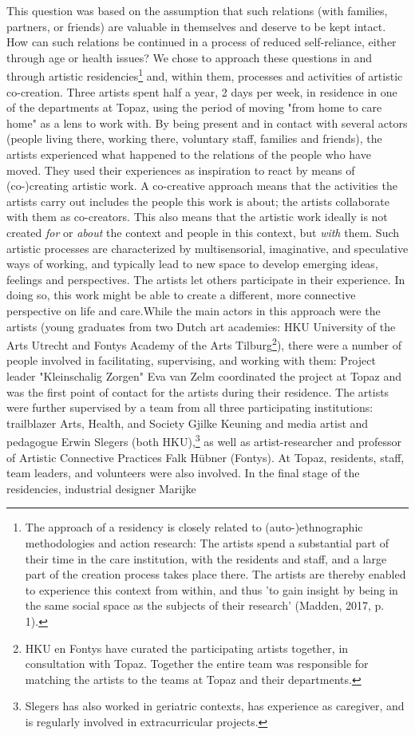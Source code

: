 \documentclass[authordate, empirical]{jote-new-article}
\begin{document}
	This question was based on the assumption that such relations (with families, partners, or friends) are valuable in themselves and deserve to be kept intact. How can such relations be continued in a process of reduced self-reliance, either through age or health issues? We chose to approach these questions in and through artistic residencies\footnote{The approach of a residency is closely related to \linebreak (auto-)ethnographic methodologies and action research: The artists spend a substantial part of their time in the care institution, with the residents and staff, and a large part of the creation process takes place there. The artists are thereby enabled to experience this context from within, and thus 'to gain insight by being in the same social space as the subjects of their research' (Madden, 2017, p. 1).} and, within them, processes and activities of artistic co-creation. Three artists spent half a year, 2 days per week, in residence in one of the departments at Topaz, using the period of moving "from home to care home" as a lens to work with. By being present and in contact with several actors (people living there, working there, voluntary staff, families and friends), the artists experienced what happened to the relations of the people who have moved. They used their experiences as inspiration to react by means of (co-)creating artistic work. A co-creative approach means that the activities the artists carry out includes the people this work is about; the artists collaborate with them as co-creators. This also means that the artistic work ideally is not created \emph{for} or \emph{about }the context and people in this context, but \emph{with} them. Such artistic processes are characterized by multisensorial, imaginative, and speculative ways of working, and typically lead to new space to develop emerging ideas, feelings and perspectives. The artists let others participate in their experience. In doing so, this work might be able to create a different, more connective perspective on life and care.While the main actors in this approach were the artists (young graduates from two Dutch art academies: HKU University of the Arts Utrecht and Fontys Academy of the Arts Tilburg\footnote{ HKU en Fontys have curated the participating artists together, in consultation with Topaz. Together the entire team was responsible for matching the artists to the teams at Topaz and their departments.}), there were a number of people involved in facilitating, supervising, and working with them: Project leader "Kleinschalig Zorgen" Eva van Zelm coordinated the project at Topaz and was the first point of contact for the artists during their residence. The artists were further supervised by a team from all three participating institutions: trailblazer Arts, Health, and Society Gjilke Keuning and media artist and pedagogue Erwin Slegers (both HKU),\footnote{ Slegers has also worked in geriatric contexts, has experience as caregiver, and is regularly involved in extracurricular projects. } as well as artist-researcher and professor of Artistic Connective Practices Falk Hübner (Fontys). At Topaz, residents, staff, team leaders, and volunteers were also involved. In the final stage of the residencies, industrial designer Marijke 
\end{document}
